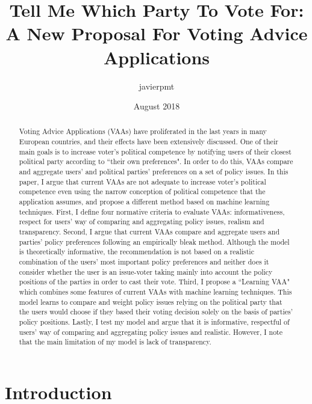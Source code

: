 \documentclass{scrartcl}
\title{Tell Me Which Party To Vote For: A New Proposal For Voting Advice Applications}
\author{javierpmt }
\date{August 2018}
\begin{document}
\maketitle

\begin{abstract}
    Voting Advice Applications (VAAs) have proliferated in the last years in many European countries, and their effects have been extensively discussed. One of their main goals is to increase voter's political competence by notifying users of their closest political party according to ``their own preferences". In order to do this, VAAs compare and aggregate users' and political parties' preferences on a set of policy issues. In this paper, I argue that current VAAs are not adequate to increase voter's political competence even using the narrow conception of political competence that the application assumes, and propose a different method based on machine learning techniques. First, I define four normative criteria to evaluate VAAs: informativeness, respect for users' way of comparing and aggregating policy issues, realism and transparency. Second, I argue that current VAAs compare and aggregate users and parties' policy preferences following an empirically bleak method. Although the model is theoretically informative, the recommendation is not based on a realistic combination of the users' most important policy preferences and neither does it consider whether the user is an issue-voter taking mainly into account the policy positions of the parties in order to cast their vote. Third, I propose a ``Learning VAA" which combines some features of current VAAs with machine learning techniques. This model learns to compare and weight policy issues relying on the political party that the users would choose if they based their voting decision solely on the basis of parties' policy positions. Lastly, I test my model and argue that it is informative, respectful of users' way of comparing and aggregating policy issues and realistic. However, I note that the main limitation of my model is lack of transparency. 
\textbf{}\end{abstract}


\newpage
\tableofcontents
\newpage

\section{Introduction}
\end{document}
